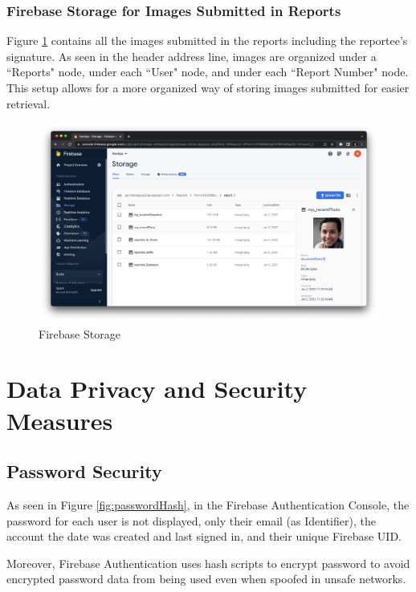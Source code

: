 \subsubsection{Firebase Storage for Images Submitted in Reports}

Figure \ref{fig:firebaseStorage} contains all the images submitted in the reports including the reportee's signature. As seen in the header address line, images are organized under a ``Reports" node, under each ``User" node, and under each ``Report Number" node. This setup allows for a more organized way of storing images submitted for easier retrieval.
\begin{figure}[!h]
    \centering
    \begin{minipage}[c]{1\linewidth}
        \centering
        \includegraphics[scale=0.25]{figures/Chapter4/Firebase/storage.png}
        \caption{Firebase Storage}
        \label{fig:firebaseStorage}
    \end{minipage}
\end{figure}
\section{Data Privacy and Security Measures}

\subsection{Password Security}

As seen in Figure \ref{fig:passwordHash}, in the Firebase Authentication Console, the password for each user is not displayed, only their email (as Identifier), the account the date was created and last signed in, and their unique Firebase UID. 

Moreover, Firebase Authentication uses hash scripts to encrypt password to avoid encrypted password data from being used even when spoofed in unsafe networks.

